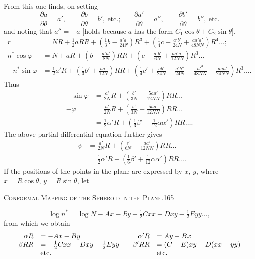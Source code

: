 From this one finds, on setting
\[
\frac{\partial a}{\partial\theta}=a',\qquad\frac{\partial b}{\partial\theta}=b',\ \text{etc.;}\qquad
\frac{\partial a'}{\partial\theta}=a'',\qquad\frac{\partial b'}{\partial\theta}=b'',\ \text{etc.}
\]
and noting that $a''=-a$ [holds because $a$ has the form $C_1\cos\theta+C_2\sin\theta$],
\[
\begin{aligned}
r&=NR+\tfrac12aRR+\left(\tfrac13b-\frac{a'a'}{24N}\right)R^3+\left(\tfrac14c-\frac{a'b'}{24N}+\frac{aa'a'}{48NN}\right)R^4\ldots;\\
n^*\cos\varphi&=N+aR+\left(b-\frac{a'a'}{8N}\right)RR+\left(c-\frac{a'b'}{6N}+\frac{aa'a'}{12NN}\right)R^3\ldots\\
-n^*\sin\varphi&=\tfrac12a'R+\left(\tfrac13b'+\frac{aa'}{12N}\right)RR
+\left(\tfrac14c'+\frac{ab'}{24N}-\frac{a'b''}{24N}+\frac{{a'}^3}{48NN}-\frac{aaa'}{24NN}\right)R^3\ldots.
\end{aligned}
\]
Thus
\[
\begin{aligned}
-\sin\varphi&=\frac{a'}{2N}R+\left(\frac{b'}{3N}-\frac{5aa'}{12NN}\right)RR\ldots\\
-\varphi&=\frac{a'}{2N}R+\left(\frac{b'}{3N}-\frac{5aa'}{12NN}\right)RR\ldots\\
&=\tfrac12\alpha'R+\left(\tfrac13\beta'-\tfrac1{12}\alpha\alpha'\right)RR\ldots.
\end{aligned}
\]
The above partial differential equation further gives
\[
\begin{aligned}
-\psi&=\frac{a'}{2N}R+\left(\frac{b'}{6N}-\frac{aa'}{12NN}\right)RR\ldots\\
&=\tfrac12\alpha'R+\left(\tfrac16\beta'+\tfrac1{12}\alpha\alpha'\right)RR\ldots.
\end{aligned}
\]
If the positions of the points in the plane are expressed by $x$, $y$, where $x=R\cos\theta$, $y=R\sin\theta$, let
\par\endgroup
\clearpage
\noindent\mbox{}\hfill\textsc{Conformal Mapping of the Spheroid in the Plane.}\hfill165\par\medskip
\begingroup\small
\[
\log n^*=\log N-Ax-By-\tfrac12Cxx-Dxy-\tfrac12Eyy\ldots,
\]
from which we obtain
\[
\begin{array}{rl@{\qquad}rl}
\alpha R&=-Ax-By&\alpha'R&=Ay-Bx\\
\beta RR&=-\tfrac12Cxx-Dxy-\tfrac12Eyy&\beta'RR&=(C-E)xy-D(xx-yy)\\
&\text{etc.}&&\text{etc.}
\end{array}
\]
